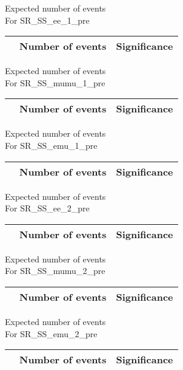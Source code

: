 \begin{frame}{Expected number of events \\ For SR\_SS\_ee\_1\_pre}
\vspace{5mm}
\begin{tabular}{|c|c|c|}
\hline
& Number of events & Significance \\
\hline

\end{tabular}
\end{frame}

\begin{frame}{Expected number of events \\ For SR\_SS\_mumu\_1\_pre}
\vspace{5mm}
\begin{tabular}{|c|c|c|}
\hline
& Number of events & Significance \\
\hline

\end{tabular}
\end{frame}

\begin{frame}{Expected number of events \\ For SR\_SS\_emu\_1\_pre}
\vspace{5mm}
\begin{tabular}{|c|c|c|}
\hline
& Number of events & Significance \\
\hline

\end{tabular}
\end{frame}

\begin{frame}{Expected number of events \\ For SR\_SS\_ee\_2\_pre}
\vspace{5mm}
\begin{tabular}{|c|c|c|}
\hline
& Number of events & Significance \\
\hline

\end{tabular}
\end{frame}

\begin{frame}{Expected number of events \\ For SR\_SS\_mumu\_2\_pre}
\vspace{5mm}
\begin{tabular}{|c|c|c|}
\hline
& Number of events & Significance \\
\hline

\end{tabular}
\end{frame}

\begin{frame}{Expected number of events \\ For SR\_SS\_emu\_2\_pre}
\vspace{5mm}
\begin{tabular}{|c|c|c|}
\hline
& Number of events & Significance \\
\hline

\end{tabular}
\end{frame}

